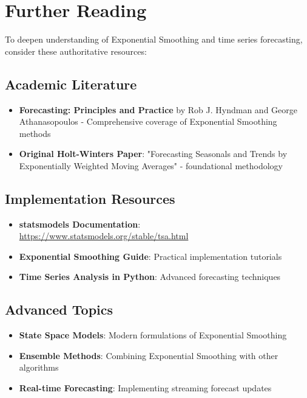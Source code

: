 \section{Further Reading}
\label{sec:further_reading}

To deepen understanding of Exponential Smoothing and time series forecasting, consider these authoritative resources:

\subsection{Academic Literature}
\begin{itemize}
    \item \textbf{Forecasting: Principles and Practice} by Rob J. Hyndman and George Athanasopoulos - Comprehensive coverage of Exponential Smoothing methods \cite{HyndmanAthanasopoulos:2021}
    \item \textbf{Original Holt-Winters Paper}: "Forecasting Seasonals and Trends by Exponentially Weighted Moving Averages" - foundational methodology \cite{Winters:1960}
\end{itemize}

\subsection{Implementation Resources}
\begin{itemize}
    \item \textbf{statsmodels Documentation}: \url{https://www.statsmodels.org/stable/tsa.html}
    \item \textbf{Exponential Smoothing Guide}: Practical implementation tutorials
    \item \textbf{Time Series Analysis in Python}: Advanced forecasting techniques
\end{itemize}

\subsection{Advanced Topics}
\begin{itemize}
    \item \textbf{State Space Models}: Modern formulations of Exponential Smoothing
    \item \textbf{Ensemble Methods}: Combining Exponential Smoothing with other algorithms
    \item \textbf{Real-time Forecasting}: Implementing streaming forecast updates
\end{itemize}

